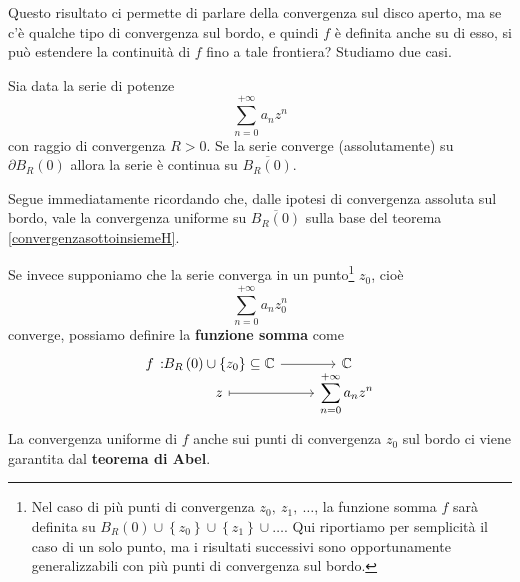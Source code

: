 Questo risultato ci permette di parlare della convergenza sul disco aperto, ma se c'è qualche tipo di convergenza sul bordo, e quindi $f$ è definita anche su di esso, si può estendere la continuità di $f$ fino a tale frontiera? Studiamo due casi.
\begin{corollary}
	Sia data la serie di potenze
	\begin{equation*}
		\sum_{n=0}^{+\infty}a_nz^n
	\end{equation*}
	con raggio di convergenza $R>0$. Se la serie converge (assolutamente) su $\partial B_R\left(0\right)$ allora la serie è continua su $\overline{B_R\left(0\right)}$.
\end{corollary}
\begin{demonstration}
	Segue immediatamente ricordando che, dalle ipotesi di convergenza assoluta sul bordo, vale la convergenza uniforme su $\overline{B_R\left(0\right)}$ sulla base del teorema \ref{convergenzasottoinsiemeH}.
\end{demonstration}
Se invece supponiamo che la serie converga in un punto\footnote{Nel caso di più punti di convergenza $z_0,\ z_1,\ \ldots$, la funzione somma $f$ sarà definita su $B_R\left(0\right)\cup\left\{z_0\right\}\cup\left\{z_1\right\}\cup\ldots$. Qui riportiamo per semplicità il caso di un solo punto, ma i risultati successivi sono opportunamente generalizzabili con più punti di convergenza sul bordo.} $z_0$, cioè
\begin{equation*}
	\sum_{n=0}^{+\infty}a_nz_0^n
\end{equation*}
converge, possiamo definire la \textbf{funzione somma} come
\begin{equation}
	\funztot{f}{B_R\left(0\right)\cup\left\{z_0\right\}\subseteq\complexset}{\complexset}{z}{\displaystyle\sum_{n=0}^{+\infty}a_nz^n}
\end{equation}
La convergenza uniforme di $f$ anche sui punti di convergenza $z_0$ sul bordo ci viene garantita dal \textbf{teorema di Abel}.
